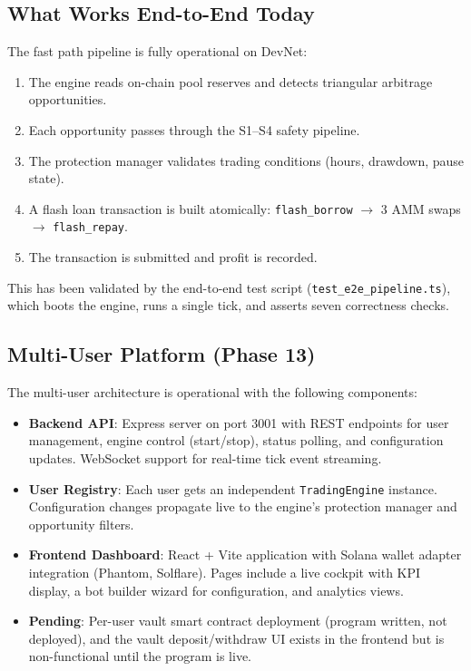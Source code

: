 \documentclass[12pt,a4paper]{article}
\begin{document}
\subsection{What Works End-to-End Today}

The fast path pipeline is fully operational on DevNet:

\begin{enumerate}[nosep]
    \item The engine reads on-chain pool reserves and detects triangular arbitrage opportunities.
    \item Each opportunity passes through the S1--S4 safety pipeline.
    \item The protection manager validates trading conditions (hours, drawdown, pause state).
    \item A flash loan transaction is built atomically: \texttt{flash\_borrow} $\rightarrow$ 3 AMM swaps $\rightarrow$ \texttt{flash\_repay}.
    \item The transaction is submitted and profit is recorded.
\end{enumerate}

This has been validated by the end-to-end test script (\texttt{test\_e2e\_pipeline.ts}), which boots the engine, runs a single tick, and asserts seven correctness checks.

\subsection{Multi-User Platform (Phase 13)}

The multi-user architecture is operational with the following components:

\begin{itemize}[nosep]
    \item \textbf{Backend API}: Express server on port 3001 with REST endpoints for user management, engine control (start/stop), status polling, and configuration updates. WebSocket support for real-time tick event streaming.
    \item \textbf{User Registry}: Each user gets an independent \texttt{TradingEngine} instance. Configuration changes propagate live to the engine's protection manager and opportunity filters.
    \item \textbf{Frontend Dashboard}: React + Vite application with Solana wallet adapter integration (Phantom, Solflare). Pages include a live cockpit with KPI display, a bot builder wizard for configuration, and analytics views.
    \item \textbf{Pending}: Per-user vault smart contract deployment (program written, not deployed), and the vault deposit/withdraw UI exists in the frontend but is non-functional until the program is live.
\end{itemize}
\end{document}
